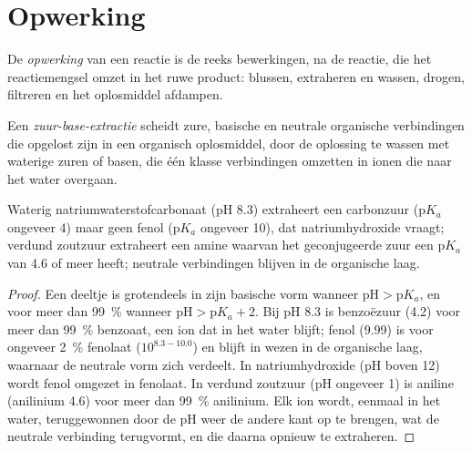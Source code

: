\section{Opwerking}

\begin{definition}[Opwerking]\label{def:b2:lab-techniques-2:work-up}
De \emph{opwerking} van een reactie is de reeks bewerkingen, na de reactie, die
het reactiemengsel omzet in het ruwe product: blussen, extraheren en wassen, drogen,
filtreren en het oplosmiddel afdampen.
\end{definition}

\begin{definition}\label{def:b2:lab-techniques-2:acid-base-extraction}
Een \emph{zuur-base-extractie} scheidt zure, basische en neutrale organische
verbindingen die opgelost zijn in een organisch oplosmiddel, door de oplossing te wassen met waterige zuren of basen, die
één klasse verbindingen omzetten in ionen die naar het water overgaan.
\end{definition}

\begin{proposition}\label{prop:b2:lab-techniques-2:acid-base-extraction}
Waterig natriumwaterstofcarbonaat (pH 8.3) extraheert een carbonzuur ($\mathrm pK_a$ ongeveer 4) maar geen
fenol ($\mathrm pK_a$ ongeveer 10), dat natriumhydroxide vraagt; verdund zoutzuur extraheert een
amine waarvan het geconjugeerde zuur een $\mathrm pK_a$ van 4.6 of meer heeft; neutrale verbindingen blijven in de organische
laag.
\end{proposition}

\begin{proof}
Een deeltje is grotendeels in zijn basische vorm wanneer $\mathrm{pH} > \mathrm pK_a$, en voor meer dan 99~\% wanneer
$\mathrm{pH} > \mathrm pK_a + 2$. Bij pH 8.3 is benzoëzuur (4.2) voor meer dan 99~\% benzoaat, een ion
dat in het water blijft; fenol (9.99) is voor ongeveer 2~\% fenolaat ($10^{8.3 - 10.0}$) en blijft in wezen
in de organische laag, waarnaar de neutrale vorm zich verdeelt. In natriumhydroxide (pH boven 12) wordt fenol
omgezet in fenolaat. In verdund zoutzuur (pH ongeveer 1) is aniline (anilinium 4.6) voor meer dan
99~\% anilinium. Elk ion wordt, eenmaal in het water, teruggewonnen door de pH weer de andere kant op te brengen, wat
de neutrale verbinding terugvormt, en die daarna opnieuw te extraheren.
\end{proof}


